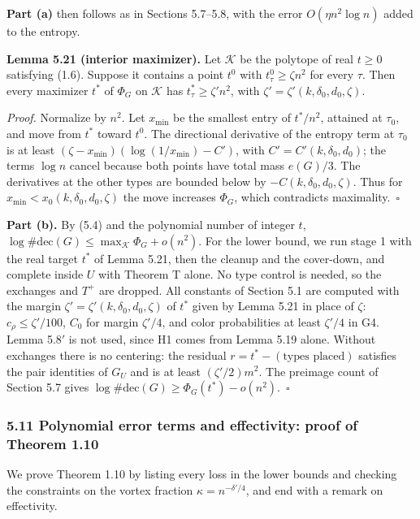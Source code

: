 \documentclass[english,11pt,a4paper]{article}
\begin{document}
\textbf{Part (a)} then follows as in Sections 5.7--5.8, with the error \(O(\eta n^2\log n)\) added to the entropy.

\textbf{Lemma 5.21 (interior maximizer).} Let \(\mathcal K\) be the polytope of real \(t\ge0\) satisfying (1.6). Suppose it contains a point \(t^0\) with \(t^0_\tau\ge\zeta n^2\) for every \(\tau\). Then every maximizer \(t^*\) of \(\Phi_G\) on \(\mathcal K\) has \(t^*_\tau\ge\zeta'n^2\), with \(\zeta'=\zeta'(k,\delta_0,d_0,\zeta)\).

\emph{Proof.} Normalize by \(n^2\). Let \(x_{\min}\) be the smallest entry of \(t^*/n^2\), attained at \(\tau_0\), and move from \(t^*\) toward \(t^0\). The directional derivative of the entropy term at \(\tau_0\) is at least \((\zeta-x_{\min})(\log(1/x_{\min})-C')\), with \(C'=C'(k,\delta_0,d_0)\); the terms \(\log n\) cancel because both points have total mass \(e(G)/3\). The derivatives at the other types are bounded below by \(-C(k,\delta_0,d_0,\zeta)\). Thus for \(x_{\min}<x_0(k,\delta_0,d_0,\zeta)\) the move increases \(\Phi_G\), which contradicts maximality.~\(\square\)

\textbf{Part (b).} By (5.4) and the polynomial number of integer \(t\), \(\log\#\mathrm{dec}(G)\le\max_{\mathcal K}\Phi_G+o(n^2)\). For the lower bound, we run stage 1 with the real target \(t^*\) of Lemma 5.21, then the cleanup and the cover-down, and complete inside \(U\) with Theorem T alone. No type control is needed, so the exchanges and \(T^+\) are dropped. All constants of Section 5.1 are computed with the margin \(\zeta'=\zeta'(k,\delta_0,d_0,\zeta)\) of \(t^*\) given by Lemma 5.21 in place of \(\zeta\): \(c_\rho\le\zeta'/100\), \(C_0\) for margin \(\zeta'/4\), and color probabilities at least \(\zeta'/4\) in G4. Lemma 5.8\('\) is not used, since H1 comes from Lemma 5.19 alone. Without exchanges there is no centering: the residual \(r=t^*-(\text{types placed})\) satisfies the pair identities of \(G_U\) and is at least \((\zeta'/2)m^2\). The preimage count of Section 5.7 gives \(\log\#\mathrm{dec}(G)\ge\Phi_G(t^*)-o(n^2)\).~\(\square\)

\subsubsection{5.11 Polynomial error terms and effectivity: proof of Theorem 1.10}\label{polynomial-error-terms-and-effectivity-proof-of-theorem-1.10}

We prove Theorem 1.10 by listing every loss in the lower bounds and checking the constraints on the vortex fraction \(\kappa=n^{-\delta'/4}\), and end with a remark on effectivity.
\end{document}
